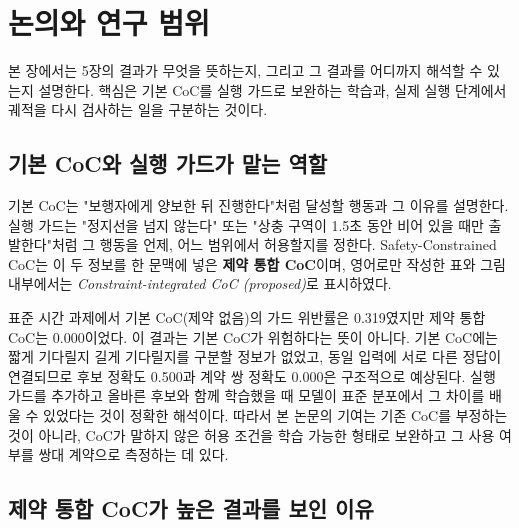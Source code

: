 \section{논의와 연구 범위}
\label{sec:discussion}

본 장에서는 5장의 결과가 무엇을 뜻하는지, 그리고 그 결과를 어디까지 해석할 수 있는지 설명한다. 핵심은 기본 CoC를 실행 가드로 보완하는 학습과, 실제 실행 단계에서 궤적을 다시 검사하는 일을 구분하는 것이다.

\subsection{기본 CoC와 실행 가드가 맡는 역할}

기본 CoC는 "보행자에게 양보한 뒤 진행한다"처럼 달성할 행동과 그 이유를 설명한다. 실행 가드는 "정지선을 넘지 않는다" 또는 "상충 구역이 1.5초 동안 비어 있을 때만 출발한다"처럼 그 행동을 언제, 어느 범위에서 허용할지를 정한다. Safety-Constrained CoC는 이 두 정보를 한 문맥에 넣은 \textbf{제약 통합 CoC}이며, 영어로만 작성한 표와 그림 내부에서는 \textit{Constraint-integrated CoC (proposed)}로 표시하였다.

표준 시간 과제에서 기본 CoC(제약 없음)의 가드 위반률은 0.319였지만 제약 통합 CoC는 0.000이었다. 이 결과는 기본 CoC가 위험하다는 뜻이 아니다. 기본 CoC에는 짧게 기다릴지 길게 기다릴지를 구분할 정보가 없었고, 동일 입력에 서로 다른 정답이 연결되므로 후보 정확도 0.500과 계약 쌍 정확도 0.000은 구조적으로 예상된다. 실행 가드를 추가하고 올바른 후보와 함께 학습했을 때 모델이 표준 분포에서 그 차이를 배울 수 있었다는 것이 정확한 해석이다. 따라서 본 논문의 기여는 기존 CoC를 부정하는 것이 아니라, CoC가 말하지 않은 허용 조건을 학습 가능한 형태로 보완하고 그 사용 여부를 쌍대 계약으로 측정하는 데 있다.


\subsection{제약 통합 CoC가 높은 결과를 보인 이유}

